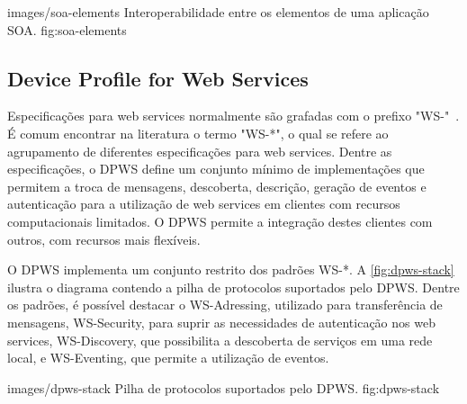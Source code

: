   {images/soa-elements}
  {Interoperabilidade entre os elementos de uma aplicação SOA.}
  {fig:soa-elements}


\subsection{Device Profile for Web Services}

Especificações para web services normalmente são grafadas com o prefixo
"{WS-}"~\cite{candido2013soa}. É comum encontrar na literatura o termo "{WS-*}", o qual se refere ao
agrupamento de diferentes especificações para web services. Dentre as especificações, o \gls{DPWS}
define um conjunto mínimo de implementações que permitem a troca de mensagens, descoberta,
descrição, geração de eventos e autenticação para a utilização de web services em clientes com
recursos computacionais limitados. O \gls{DPWS} permite a integração destes clientes com outros, com
recursos mais flexíveis.

O \gls{DPWS} implementa um conjunto restrito dos padrões {WS-*}. A \cref{fig:dpws-stack} ilustra o
diagrama contendo a pilha de protocolos suportados pelo \gls{DPWS}. Dentre os padrões, é possível
destacar o WS-Adressing, utilizado para transferência de mensagens, WS-Security, para suprir as necessidades de autenticação nos web services, WS-Discovery, que possibilita
a descoberta de serviços em uma rede local, e WS-Eventing, que permite a utilização de eventos.

  {images/dpws-stack}
  {Pilha de protocolos suportados pelo DPWS.}
  {fig:dpws-stack}
